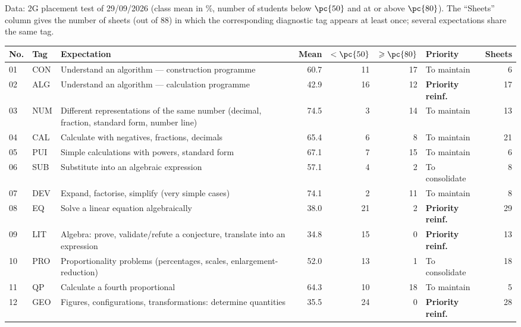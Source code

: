 Data: 2G placement test of 29/09/2026 (class mean in \%, number of students below $\pc{50}$ and at or above $\pc{80}$). The ``Sheets'' column gives the number of sheets (out of $88$) in which the corresponding diagnostic tag appears at least once; several expectations share the same tag.\par\smallskip
{\footnotesize{}\begin{tabular}{@{}l l p{7.1cm} r r r l r@{}}\toprule
No. & Tag & Expectation & Mean & $<\pc{50}$ & $\geqslant\pc{80}$ & Priority & Sheets \\ \midrule
01 & CON & Understand an algorithm — construction programme & \num{60,7} & 11 & 17 & To maintain & 6 \\
02 & ALG & Understand an algorithm — calculation programme & \num{42,9} & 16 & 12 & \textbf{Priority reinf.} & 17 \\
03 & NUM & Different representations of the same number (decimal, fraction, standard form, number line) & \num{74,5} & 3 & 14 & To maintain & 13 \\
04 & CAL & Calculate with negatives, fractions, decimals & \num{65,4} & 6 & 8 & To maintain & 21 \\
05 & PUI & Simple calculations with powers, standard form & \num{67,1} & 7 & 15 & To maintain & 6 \\
06 & SUB & Substitute into an algebraic expression & \num{57,1} & 4 & 2 & To consolidate & 8 \\
07 & DEV & Expand, factorise, simplify (very simple cases) & \num{74,1} & 2 & 11 & To maintain & 8 \\
08 & EQ & Solve a linear equation algebraically & \num{38,0} & 21 & 2 & \textbf{Priority reinf.} & 29 \\
09 & LIT & Algebra: prove, validate/refute a conjecture, translate into an expression & \num{34,8} & 15 & 0 & \textbf{Priority reinf.} & 13 \\
10 & PRO & Proportionality problems (percentages, scales, enlargement-reduction) & \num{52,0} & 13 & 1 & To consolidate & 18 \\
11 & QP & Calculate a fourth proportional & \num{64,3} & 10 & 18 & To maintain & 5 \\
12 & GEO & Figures, configurations, transformations: determine quantities & \num{35,5} & 24 & 0 & \textbf{Priority reinf.} & 28 \\

\end{tabular}}
